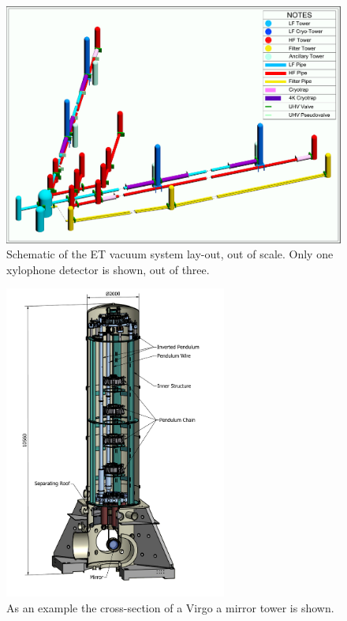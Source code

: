 \begin{figure}
\begin{center}
\includegraphics[width=\textwidth]{Sec_SiteInfra/Figures/VAC1.pdf}
\caption{Schematic of the ET vacuum system lay-out, out of scale. Only one xylophone detector is shown, out of three.}
\label{fig:vac1}
\end{center}
\end{figure}

\begin{figure}
\begin{center}
\includegraphics[width=0.65\textwidth]{Sec_SiteInfra/Figures/AssNETow2.pdf}
\caption{As an example the cross-section of a Virgo a mirror tower is shown.}
\label{fig:vac2}
\end{center}
\end{figure}


